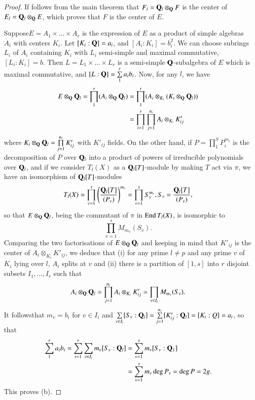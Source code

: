 \begin{proof}
If follows from the main theorem that $F_l = \mathbf{Q}_l \otimes_{\mathbf{Q}} F$ is the center of $E_l = \mathbf{Q}_l \otimes_{\mathbf{Q}} E$, which proves that $F$ is the center of $E$. 

Suppose\pageoriginale $E = A_1 \times \ldots \times A_r$ is the expression of $E$ as a product of simple algebras $A_i$ with centers $K_i$. Let $[K_i:\mathbf{Q}] = a_i$, and $[A_i: K_i] = b^2_i$. We can choose subrings $L_i$ of $A_i$ containing $K_i$ with $L_i$ semi-simple and maximal commutative, $[L_i: K_i] =b$. Then $L = L_1 \times \ldots \times L_r$ is a semi-simple $\mathbf{Q}$-subalgebra of $E$ which is maximal commutative, and $[L:\mathbf{Q}] = \sum\limits^r_1 a_i b_i$. Now, for any $l$, we have
\begin{align*}
E \otimes_{\mathbf{Q}} \mathbf{Q}_l = \prod\limits^r_1 (A_i \otimes_{\mathbf{Q}} \mathbf{Q}_l) & = \prod\limits^r_1 (A_i \otimes_{K_i} (K_i \otimes_{\mathbf{Q}} \mathbf{Q}_l))\\
& = \prod\limits^r_{i=1} \prod\limits^{n_i}_{j=1} A_i \otimes_{K_i} K'_{ij}
\end{align*}
where $K_i \otimes_{\mathbf{Q}} \mathbf{Q}_l = \prod\limits^{n_i}_{j=1} K'_{ij}$ with $K'_{ij}$ fields. On the other hand, if $P = \prod\limits^S_1 P^{m_i}_i$ is the decomposition of $P$ over $\mathbf{Q}_l$ into a product of powers of irreducible polynomials over $\mathbf{Q}_l$, and if we consider $T_l(X)$ as a $\mathbf{Q}_l[T]$-module by making $T$ act via $\pi$, we have an isomorphism of $\mathbf{Q}_l[T]$-modules
$$
T_l(X) \simeq \prod\limits^s_{v=1} \left(\frac{\mathbf{Q}_l[T]}{(P_v)} \right)^{m_v} = \prod\limits^s_{v=1} S^{m_v}_v, S_v = \frac{\mathbf{Q}_l[T]}{(P_v)},
$$
so that $E \otimes_{\mathbf{Q}} \mathbf{Q}_l$, being the commutant of $\pi$ in $\operatorname{End} T_l(X)$, is isomorphic to 
$$
\prod\limits^s_{v=1} M_{m_v} (S_v).
$$
Comparing the two factorisations of $E \otimes_{\mathbf{Q}} \mathbf{Q}_l$ and keeping in mind that $K'_{ij}$ is the center of $A_i\otimes_{K_i} K'_{ij}$, we deduce that (i) for any prime $l \neq p$ and any prime $v$ of $K_i$ lying over $l$, $A_i$ splits at $v$ and (ii) there is a partition of $[1,s]$ into $r$ disjoint subsets $I_{1}, \ldots, I_r$ such that 
$$
A_i \otimes_{\mathbf{Q}} \mathbf{Q}_l\simeq \prod\limits^{n_i}_{j=1} A_i \otimes_{K_i} K'_{ij} \simeq \prod\limits_{v \in I_i} M_{m_v} (S_v).
$$
It follows\pageoriginale that $m_v = b_i$ for $v \in I_i$ and $\sum\limits_{v \in I_i} [S_v : \mathbf{Q}_l] = \sum\limits^{n_i}_{j=1} [K'_{ij}: \mathbf{Q}_l] = [K_i: Q] = a_i$, so that
\begin{align*}
\sum\limits^r_1 a_i b_i = \sum\limits^r_{i=1} \sum\limits_{v \in I_i} m_v [S_v : \mathbf{Q}_l] & = \sum\limits^s_{v=1} m_v[S_v: \mathbf{Q}_1]\\
& = \sum\limits^s_{v=1} m_v \deg P_v = \deg P = 2g.
\end{align*}            
This proves (b).



\end{proof}
